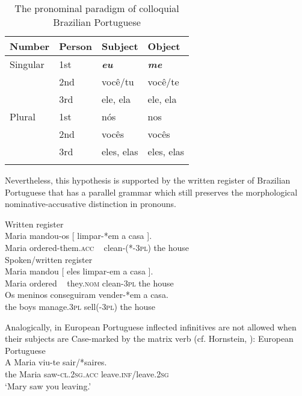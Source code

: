 \documentclass[output=paper]{langsci/langscibook}
\begin{document}
\begin{table}
\caption{\label{tab:moreno:1}The pronominal paradigm of colloquial Brazilian Portuguese}
\begin{tabular}{llll}
\lsptoprule
{Number}   & Person & Subject & Object\\\midrule
{Singular} & 1st & \textbf{\textit{eu}} & \textbf{\textit{me}}\\
           & 2nd & você/tu & você/te\\
           & 3rd & ele, ela & ele, ela\\\midrule
{Plural}   & 1st & nós & nos\\
           & 2nd & vocês & vocês\\
           & 3rd & eles, elas & eles, elas\\
\lspbottomrule
\end{tabular}
\end{table}

Nevertheless, this hypothesis is supported by the written register of Brazilian Portuguese that has a parallel grammar which still preserves the morphological nominative-accusative distinction in pronouns.

\ea%
    \label{ex:moreno:24}
    \ea  Written register\\
    \gll Maria mandou-os     [  limpar-*em    a    casa ].   \\
         Maria ordered-them.\textsc{acc}   ~    clean-(*-\textsc{3pl}) the house\\
    \ex  Spoken/written register\\
    \gll Maria mandou [ eles   limpar-em a    casa ].   \\
         Maria ordered  ~  they.\textsc{nom} clean-\textsc{3pl}  the house \\
    \ex  
    \gll Os meninos conseguiram  vender-*em  a    casa. \\
         the boys      manage.\textsc{3pl}    sell(-\textsc{3pl})     the house \\
\z
\z

Analogically, in European Portuguese inflected infinitives are not allowed when their subjects are Case-marked by the matrix verb (cf. Hornstein, \citealt{Martins2008}):
\ea%
         European Portuguese\label{ex:moreno:25}\\
    \gll A   Maria viu-te           sair/*saires.\\
         the Maria saw-\textsc{cl.2sg.acc} leave.\textsc{inf}/leave.\textsc{2sg}\\
    \glt ‘Mary saw you leaving.’
\z
\end{document}
